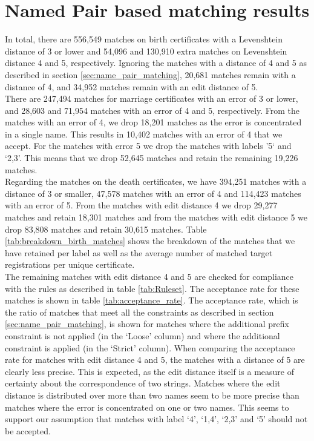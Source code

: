 \section{Named Pair based matching results}
In total, there are 556,549 matches on birth certificates with a Levenshtein distance of 3 or lower and 54,096 and 130,910 extra matches on Levenshtein distance 4 and 5, respectively. Ignoring the matches with a distance of 4 and 5 as described in section \ref{sec:name_pair_matching}, 20,681 matches remain with a distance of 4, and 34,952 matches remain with an edit distance of 5. \\
There are 247,494 matches for marriage certificates with an error of 3 or lower, and 28,603 and 71,954 matches with an error of 4 and 5, respectively. From the matches with an error of 4, we drop 18,201 matches as the error is concentrated in a single name. This results in 10,402 matches with an error of 4 that we accept. For the matches with error 5 we drop the matches with labels '5` and `2,3'. This means that we drop 52,645 matches and retain the remaining 19,226 matches.\\
Regarding the matches on the death certificates, we have 394,251 matches with a distance of 3 or smaller, 47,578 matches with an error of 4 and 114,423 matches with an error of 5. From the matches with edit distance 4 we drop 29,277 matches and retain 18,301 matches and from the matches with edit distance 5 we drop 83,808 matches and retain 30,615 matches. Table \ref{tab:breakdown_birth_matches} shows the breakdown of the matches that we have retained per label as well as the average number of matched target registrations per unique certificate. \\

The remaining matches with edit distance 4 and 5 are checked for compliance with the rules as described in table \ref{tab:Ruleset}. The acceptance rate for these matches is shown in table \ref{tab:acceptance_rate}. The acceptance rate, which is the ratio of matches that meet all the constraints as described in section \ref{sec:name_pair_matching}, is shown for matches where the additional prefix constraint is not applied (in the `Loose' column) and where the additional constraint is applied (in the `Strict' column). When comparing the acceptance rate for matches with edit distance 4 and 5, the matches with a distance of 5 are clearly less precise. This is expected, as the edit distance itself is a measure of certainty about the correspondence of two strings. Matches where the edit distance is distributed over more than two names seem to be more precise than matches where the error is concentrated on one or two names. This seems to support our assumption that matches with label `4', `1,4', `2,3' and `5' should not be accepted. \newline


